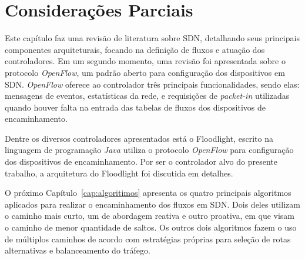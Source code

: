 
\section{Considerações Parciais} 
\label{sec:consider}

Este capítulo faz uma revisão de literatura sobre SDN, detalhando seus principais componentes arquiteturais, focando na definição de fluxos e atuação dos controladores.
Em um segundo momento, uma revisão foi apresentada sobre o protocolo \textit{OpenFlow}, um padrão aberto para configuração dos dispositivos em SDN.
\textit{OpenFlow} oferece ao controlador três principais funcionalidades, sendo elas: mensagens de eventos, estatísticas da rede, e requisições de \textit{packet-in} utilizadas quando houver falta na entrada das tabelas de fluxos dos dispositivos de encaminhamento.

Dentre os diversos controladores apresentados está o Floodlight, escrito na linguagem de programação \textit{Java} utiliza o protocolo \textit{OpenFlow} para configuração dos dispositivos de encaminhamento. Por ser o controlador alvo do presente trabalho, a arquitetura do Floodlight foi discutida em detalhes.

O próximo Capítulo~\ref{cap:algoritimos} apresenta os quatro principais algoritmos aplicados para realizar o encaminhamento dos fluxos em SDN. Dois deles utilizam o caminho mais curto, um de abordagem reativa e outro proativa, em que visam o caminho de menor quantidade de saltos. Os outros dois algoritmos fazem o uso de múltiplos caminhos de acordo com estratégias próprias para seleção de rotas alternativas e balanceamento do tráfego. 
